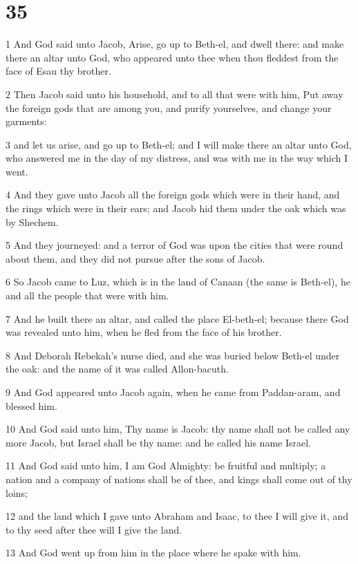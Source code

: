 \chapter{35}

\par 1 And God said unto Jacob, Arise, go up to Beth-el, and dwell there: and make there an altar unto God, who appeared unto thee when thou fleddest from the face of Esau thy brother.
\par 2 Then Jacob said unto his household, and to all that were with him, Put away the foreign gods that are among you, and purify yourselves, and change your garments:
\par 3 and let us arise, and go up to Beth-el; and I will make there an altar unto God, who answered me in the day of my distress, and was with me in the way which I went.
\par 4 And they gave unto Jacob all the foreign gods which were in their hand, and the rings which were in their ears; and Jacob hid them under the oak which was by Shechem.
\par 5 And they journeyed: and a terror of God was upon the cities that were round about them, and they did not pursue after the sons of Jacob.
\par 6 So Jacob came to Luz, which is in the land of Canaan (the same is Beth-el), he and all the people that were with him.
\par 7 And he built there an altar, and called the place El-beth-el; because there God was revealed unto him, when he fled from the face of his brother.
\par 8 And Deborah Rebekah's nurse died, and she was buried below Beth-el under the oak: and the name of it was called Allon-bacuth.
\par 9 And God appeared unto Jacob again, when he came from Paddan-aram, and blessed him.
\par 10 And God said unto him, Thy name is Jacob: thy name shall not be called any more Jacob, but Israel shall be thy name: and he called his name Israel.
\par 11 And God said unto him, I am God Almighty: be fruitful and multiply; a nation and a company of nations shall be of thee, and kings shall come out of thy loins;
\par 12 and the land which I gave unto Abraham and Isaac, to thee I will give it, and to thy seed after thee will I give the land.
\par 13 And God went up from him in the place where he spake with him.
